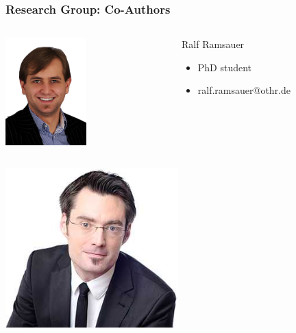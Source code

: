 \documentclass{beamer}
\begin{document}
	\begin{frame}
	\frametitle{Research Group: Co-Authors}
	\begin{minipage}[c]{1.0\linewidth}
		\begin{columns}
		\begin{column}{0.35\textwidth}
			\begin{center}
     		\includegraphics[width=0.5\textwidth]{pics/speakers_ralf.png}
			\end{center}
		\end{column}
		\begin{column}{0.7\textwidth}
		\begin{block}{Ralf Ramsauer}
			\begin{itemize}
				\item PhD student
				\item ralf.ramsauer@othr.de
			\end{itemize}
		\end{block}
		\end{column}
		\end{columns}
	\end{minipage}
	\begin{minipage}[c]{1.0\linewidth}
		\begin{columns}
		\begin{column}{0.35\textwidth}
			\begin{center}
     		\includegraphics[width=0.5\textwidth]{pics/speakers_mauerer.jpeg}

\end{center}
\end{column}
\end{columns}
\end{minipage}
\end{frame}
\end{document}
